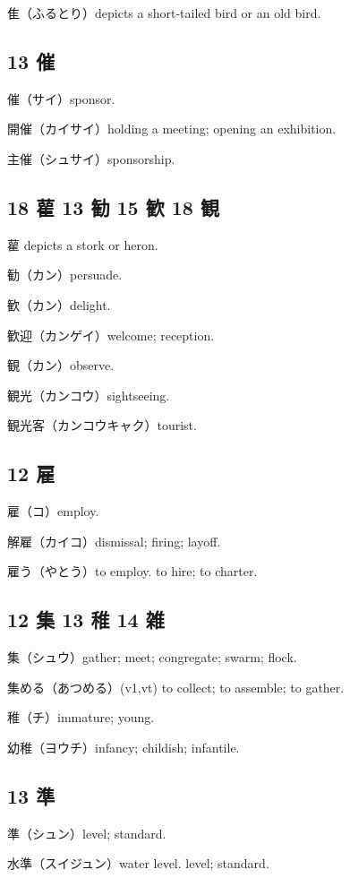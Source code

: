 隹（ふるとり）depicts a short-tailed bird or an old bird.

\subsection{13 催}

催（サイ）sponsor.

開催（カイサイ）holding a meeting; opening an exhibition.

主催（シュサイ）sponsorship.

\subsection{18 雚 13 勧 15 歓 18 観}

雚 depicts a stork or heron.

勧（カン）persuade.

歓（カン）delight.

歓迎（カンゲイ）welcome; reception.

観（カン）observe.

観光（カンコウ）sightseeing.

観光客（カンコウキャク）tourist.

\subsection{12 雇}

雇（コ）employ.

解雇（カイコ）dismissal; firing; layoff.

雇う（やとう）to employ. to hire; to charter.

\subsection{12 集 13 稚 14 雑}

集（シュウ）gather; meet; congregate; swarm; flock.

集める（あつめる）(v1,vt) to collect; to assemble; to gather.

稚（チ）immature; young.

幼稚（ヨウチ）infancy; childish; infantile.

\subsection{13 準}

準（シュン）level; standard.

水準（スイジュン）water level. level; standard.

